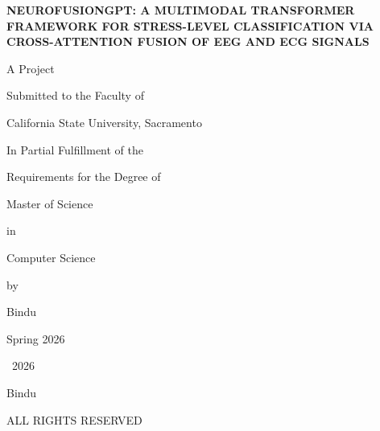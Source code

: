 \documentclass[12pt,letterpaper]{report}
\begin{document}

\begin{titlepage}
\thispagestyle{empty}
\begin{center}
\vspace*{1in}

{\Large\bfseries NEUROFUSIONGPT: A MULTIMODAL TRANSFORMER FRAMEWORK FOR STRESS-LEVEL CLASSIFICATION VIA CROSS-ATTENTION FUSION OF EEG AND ECG SIGNALS}

\vspace{1.5in}

A Project

Submitted to the Faculty of

California State University, Sacramento

\vspace{0.5in}

In Partial Fulfillment of the

Requirements for the Degree of

\vspace{0.5in}

Master of Science

in

Computer Science

\vspace{1.0in}

by

Bindu

\vspace{0.5in}

Spring 2026

\end{center}
\end{titlepage}

\clearpage
\thispagestyle{empty}
\vspace*{\fill}
\begin{center}
\textcopyright\ 2026

Bindu

ALL RIGHTS RESERVED
\end{center}
\vspace*{\fill}
\end{document}
